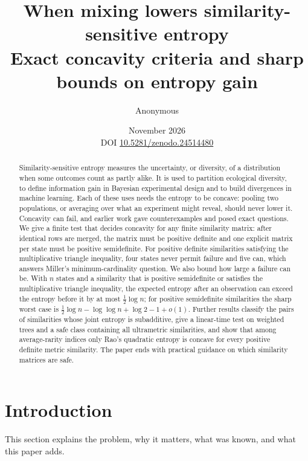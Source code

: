 \documentclass[11pt,a4paper]{article}
\title{When mixing lowers similarity-sensitive entropy\\[3pt]
\large Exact concavity criteria and sharp bounds on entropy gain}
\author{Anonymous}
\date{November 2026\\[2pt]\small DOI \href{https://doi.org/10.5281/zenodo.24514480}{10.5281/zenodo.24514480}}
\theoremstyle{remark}
\begin{document}
\maketitle
\begin{abstract}
Similarity-sensitive entropy measures the uncertainty, or diversity, of a distribution when some outcomes count as partly alike. It is used to partition ecological diversity, to define information gain in Bayesian experimental design and to build divergences in machine learning. Each of these uses needs the entropy to be concave: pooling two populations, or averaging over what an experiment might reveal, should never lower it. Concavity can fail, and earlier work gave counterexamples and posed exact questions. We give a finite test that decides concavity for any finite similarity matrix: after identical rows are merged, the matrix must be positive definite and one explicit matrix per state must be positive semidefinite. For positive definite similarities satisfying the multiplicative triangle inequality, four states never permit failure and five can, which answers Miller's minimum-cardinality question. We also bound how large a failure can be. With $n$ states and a similarity that is positive semidefinite or satisfies the multiplicative triangle inequality, the expected entropy after an observation can exceed the entropy before it by at most $\tfrac12\log n$; for positive semidefinite similarities the sharp worst case is $\tfrac12\log n-\log\log n+\log 2-1+o(1)$. Further results classify the pairs of similarities whose joint entropy is subadditive, give a linear-time test on weighted trees and a safe class containing all ultrametric similarities, and show that among average-rarity indices only Rao's quadratic entropy is concave for every positive definite metric similarity. The paper ends with practical guidance on which similarity matrices are safe.
\end{abstract}

\section{Introduction}\label{sec:intro}
This section explains the problem, why it matters, what was known, and what this paper adds.
\end{document}
